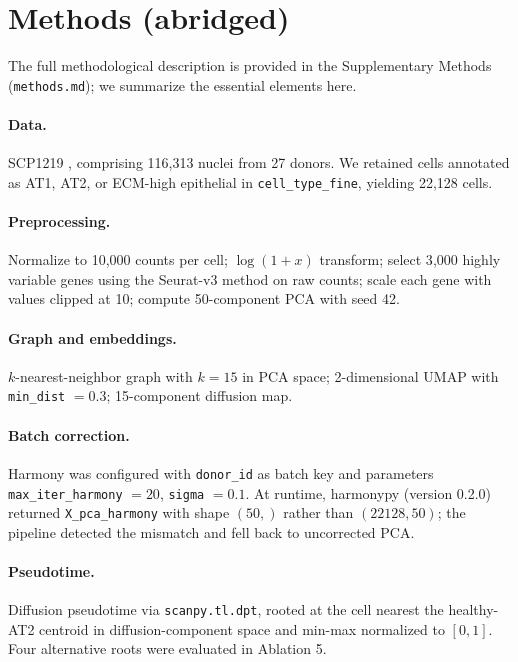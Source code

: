 \documentclass[11pt]{article}
\begin{document}
\section*{Methods (abridged)}

The full methodological description is provided in the Supplementary Methods (\texttt{methods.md}); we summarize the essential elements here.

\paragraph{Data.} SCP1219 \citep{Melms2021}, comprising 116{,}313 nuclei from 27 donors. We retained cells annotated as AT1, AT2, or ECM-high epithelial in \texttt{cell\_type\_fine}, yielding 22{,}128 cells.

\paragraph{Preprocessing.} Normalize to 10{,}000 counts per cell; $\log(1+x)$ transform; select 3{,}000 highly variable genes using the Seurat-v3 method on raw counts; scale each gene with values clipped at 10; compute 50-component PCA with seed 42.

\paragraph{Graph and embeddings.} $k$-nearest-neighbor graph with $k = 15$ in PCA space; 2-dimensional UMAP with \texttt{min\_dist} $= 0.3$; 15-component diffusion map.

\paragraph{Batch correction.} Harmony \citep{Korsunsky2019} was configured with \texttt{donor\_id} as batch key and parameters \texttt{max\_iter\_harmony} $= 20$, \texttt{sigma} $= 0.1$. At runtime, harmonypy (version 0.2.0) returned \texttt{X\_pca\_harmony} with shape $(50,)$ rather than $(22128, 50)$; the pipeline detected the mismatch and fell back to uncorrected PCA.

\paragraph{Pseudotime.} Diffusion pseudotime \citep{Haghverdi2016} via \texttt{scanpy.tl.dpt}, rooted at the cell nearest the healthy-AT2 centroid in diffusion-component space and min-max normalized to $[0, 1]$. Four alternative roots were evaluated in Ablation 5.
\end{document}
